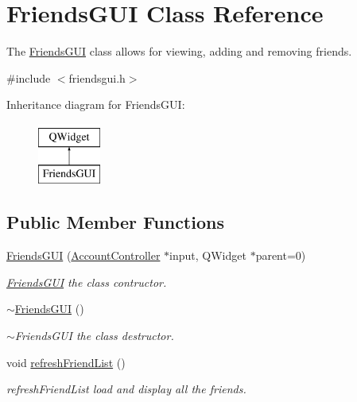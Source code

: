 \hypertarget{classFriendsGUI}{}\section{Friends\+G\+UI Class Reference}
\label{classFriendsGUI}


The \hyperlink{classFriendsGUI}{Friends\+G\+UI} class allows for viewing, adding and removing friends.  




{\ttfamily \#include $<$friendsgui.\+h$>$}

Inheritance diagram for Friends\+G\+UI\+:\begin{figure}[H]
\begin{center}
\leavevmode
\includegraphics[height=2.000000cm]{classFriendsGUI}
\end{center}
\end{figure}
\subsection*{Public Member Functions}
\begin{DoxyCompactItemize}
\item 
\hyperlink{classFriendsGUI_a55d0d5aa6e1d76c14f58a36e46e909c3}{Friends\+G\+UI} (\hyperlink{classAccountController}{Account\+Controller} $\ast$input, Q\+Widget $\ast$parent=0)
\begin{DoxyCompactList}\small\item\em \hyperlink{classFriendsGUI}{Friends\+G\+UI} the class contructor. \end{DoxyCompactList}\item 
\hyperlink{classFriendsGUI_afdaa30d705a4d77f0367b40949aa6664}{$\sim$\+Friends\+G\+UI} ()
\begin{DoxyCompactList}\small\item\em $\sim$\+Friends\+G\+UI the class destructor. \end{DoxyCompactList}\item 
void \hyperlink{classFriendsGUI_a773e93853c281c22f36214994283d611}{refresh\+Friend\+List} ()\hypertarget{classFriendsGUI_a773e93853c281c22f36214994283d611}{}\label{classFriendsGUI_a773e93853c281c22f36214994283d611}

\begin{DoxyCompactList}\small\item\em refresh\+Friend\+List load and display all the friends. \end{DoxyCompactList}\end{DoxyCompactItemize}


